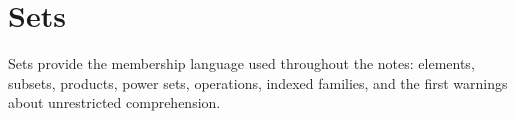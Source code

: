 \section{Sets}

Sets provide the membership language used throughout the notes: elements, subsets, products, power sets, operations, indexed families, and the first warnings about unrestricted comprehension.












